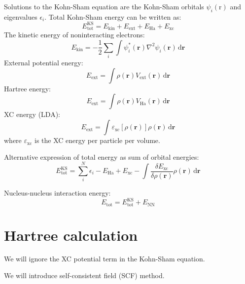 Solutions to the Kohn-Sham equation are the Kohn-Sham orbitals
$\psi_{i}(\mathrm{r})$ and eigenvalues $\epsilon_{i}$.
Total Kohn-Sham energy can be written as:
\begin{equation}
E^{\mathrm{KS}}_{\mathrm{tot}} = E_{\mathrm{kin}} + E_{\mathrm{ext}}
+ E_{\mathrm{Ha}} + E_{\mathrm{xc}}
\end{equation}
%
The kinetic energy of noninteracting electrons:
\begin{equation}
E_{\mathrm{kin}} = -\frac{1}{2}\sum_{i} \int \psi_{i}^{*}(\mathbf{r}) \nabla^2 \psi_{i}(\mathbf{r})
\,\mathrm{d}\mathbf{r}
\end{equation}
%
External potential energy:
\begin{equation}
E_{\mathrm{ext}} = \int \rho(\mathbf{r}) V_{\mathrm{ext}}(\mathbf{r})
\,\mathrm{d}\mathbf{r}
\end{equation}
%
Hartree energy:
\begin{equation}
E_{\mathrm{ext}} = \int \rho(\mathbf{r}) V_{\mathrm{Ha}}(\mathbf{r})
\,\mathrm{d}\mathbf{r}
\end{equation}
%
XC energy (LDA):
\begin{equation}
E_{\mathrm{ext}} = \int \varepsilon_{\mathrm{xc}}[\rho(\mathbf{r})] \rho(\mathbf{r})
\,\mathrm{d}\mathbf{r}
\end{equation}
where $\varepsilon_{\mathrm{xc}}$ is the XC energy per particle per volume.

Alternative expression of total energy as sum of orbital energies:
\begin{equation}
E^{\mathrm{KS}}_{\mathrm{tot}} = \sum_{i}^{N} \epsilon_{i} - E_{\mathrm{Ha}} + E_{\mathrm{xc}}
- \int \frac{\delta E_{\mathrm{xc}}}{\delta \rho(\mathbf{r})} \rho(\mathbf{r})
\,\mathrm{d}\mathbf{r}
\end{equation}

Nucleus-nucleus interaction energy:
\begin{equation}
E_{\mathrm{tot}} = E^{\mathrm{KS}}_{\mathrm{tot}} + E_{\mathrm{NN}}
\end{equation}



\section{Hartree calculation}

We will ignore the XC potential term in the Kohn-Sham equation.

We will introduce self-consistent field (SCF) method.

